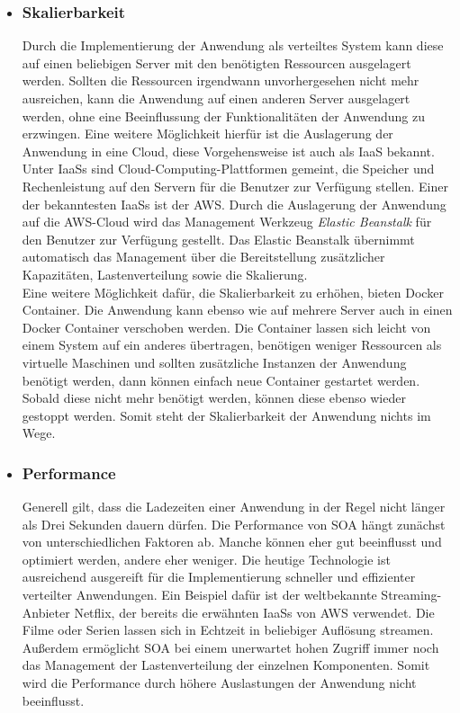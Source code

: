 \begin{itemize}
\item \subsubsection*{Skalierbarkeit} 
Durch die Implementierung der Anwendung als verteiltes System kann diese auf einen beliebigen Server mit den benötigten Ressourcen ausgelagert werden. Sollten die Ressourcen irgendwann unvorhergesehen nicht mehr ausreichen, kann die Anwendung auf einen anderen Server ausgelagert werden, ohne eine Beeinflussung der Funktionalitäten der Anwendung zu erzwingen. Eine weitere Möglichkeit hierfür ist die Auslagerung der Anwendung in eine Cloud, diese Vorgehensweise ist auch als \ac{IaaS} bekannt. Unter \acp{IaaS} sind Cloud-Computing-Plattformen gemeint, die Speicher und Rechenleistung auf den Servern für die Benutzer zur Verfügung stellen. Einer der bekanntesten \acp{IaaS} ist der \ac{AWS}. Durch die Auslagerung der Anwendung auf die \ac{AWS}-Cloud wird das Management Werkzeug \textit{Elastic Beanstalk} für den Benutzer zur Verfügung gestellt. Das Elastic Beanstalk übernimmt automatisch das Management über die Bereitstellung zusätzlicher Kapazitäten, Lastenverteilung sowie die Skalierung\autocite[Vgl.][]{aws}.
\\
\linebreak
Eine weitere Möglichkeit dafür, die Skalierbarkeit zu erhöhen, bieten Docker Container. Die Anwendung kann ebenso wie auf mehrere Server auch in einen Docker Container verschoben werden. Die Container lassen sich leicht von einem System auf ein anderes übertragen, benötigen weniger Ressourcen als virtuelle Maschinen und sollten zusätzliche Instanzen der Anwendung benötigt werden, dann können einfach neue Container gestartet werden. Sobald diese nicht mehr benötigt werden, können diese ebenso wieder gestoppt werden\autocite[Vgl.][]{docker}. Somit steht der Skalierbarkeit der Anwendung nichts im Wege.

\item \subsubsection*{Performance} 
Generell gilt, dass die Ladezeiten einer Anwendung in der Regel nicht länger als Drei Sekunden dauern dürfen. Die Performance von \ac{SOA} hängt zunächst von unterschiedlichen Faktoren ab. Manche können eher gut beeinflusst und optimiert werden, andere eher weniger. Die heutige Technologie ist ausreichend ausgereift für die Implementierung schneller und effizienter verteilter Anwendungen. Ein Beispiel dafür ist der weltbekannte Streaming-Anbieter Netflix, der bereits die erwähnten \acp{IaaS} von \ac{AWS} verwendet. Die Filme oder Serien lassen sich in Echtzeit in beliebiger Auflösung streamen\autocite[Vgl.][]{netflix}.
Außerdem ermöglicht \ac{SOA} bei einem unerwartet hohen Zugriff immer noch das Management der Lastenverteilung der einzelnen Komponenten. Somit wird die Performance durch höhere Auslastungen der Anwendung nicht beeinflusst.


\end{itemize}
